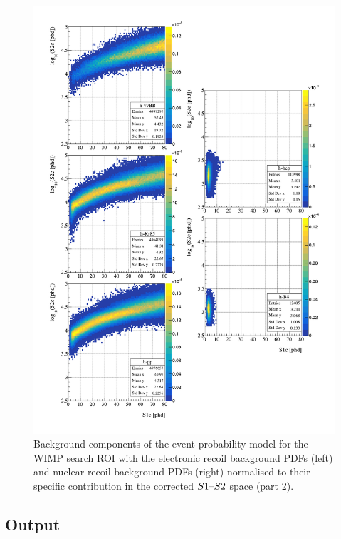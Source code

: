 \begin{figure}[h!]
    \ContinuedFloat 
    \centering
    \includegraphics[scale=0.7]{Chapter_5/Figures/sensitivity_studies/background_pdfs_2.pdf}
    \caption[Background components of the event probability model for the WIMP search ROI (2).]%
    {Background components of the event probability model for the WIMP search ROI with the electronic recoil background PDFs (left) and nuclear recoil background PDFs (right) normalised to their specific contribution in the corrected $S1\text{--}{}S2$ space (part 2).}
    \label{fig:lz_background_pdfs}
\end{figure}
%

\clearpage

\subsection{Output}
\label{secsec:detector_param}

